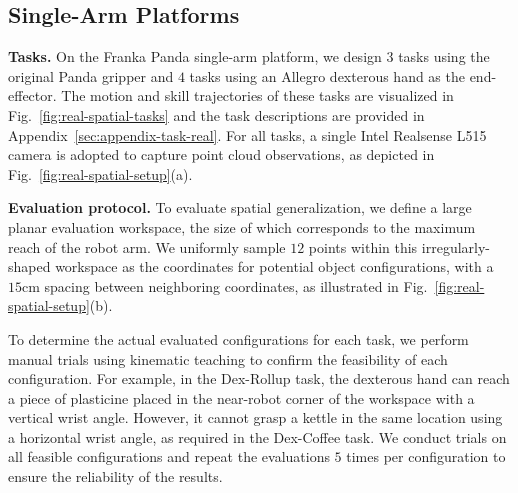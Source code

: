 \subsection{Single-Arm Platforms}

\noindent\textbf{Tasks.}
On the Franka Panda single-arm platform, we design $3$ tasks using the original Panda gripper and $4$ tasks using an Allegro dexterous hand as the end-effector. The \textcolor{myorange}{motion} and \textcolor{myblue}{skill} trajectories of these tasks are visualized in Fig.~\ref{fig:real-spatial-tasks} and the task descriptions are provided in Appendix~\ref{sec:appendix-task-real}.
For all tasks, a single Intel Realsense L515 camera is adopted to capture point cloud observations, as depicted in Fig.~\ref{fig:real-spatial-setup}(a).

\vspace{0.2cm} \noindent\textbf{Evaluation protocol.} 
To evaluate spatial generalization, we define a large planar evaluation workspace, the size of which corresponds to the maximum reach of the robot arm. We uniformly sample $12$ points within this irregularly-shaped workspace as the coordinates for potential object configurations, with a $15\textrm{cm}$ spacing between neighboring coordinates, as illustrated in Fig.~\ref{fig:real-spatial-setup}(b).

To determine the actual evaluated configurations for each task, we perform manual trials using kinematic teaching to confirm the feasibility of each configuration. For example, in the Dex-Rollup task, the dexterous hand can reach a piece of plasticine placed in the near-robot corner of the workspace with a vertical wrist angle. However, it cannot grasp a kettle in the same location using a horizontal wrist angle, as required in the Dex-Coffee task. We conduct trials on all feasible configurations and repeat the evaluations $5$ times per configuration to ensure the reliability of the results.



